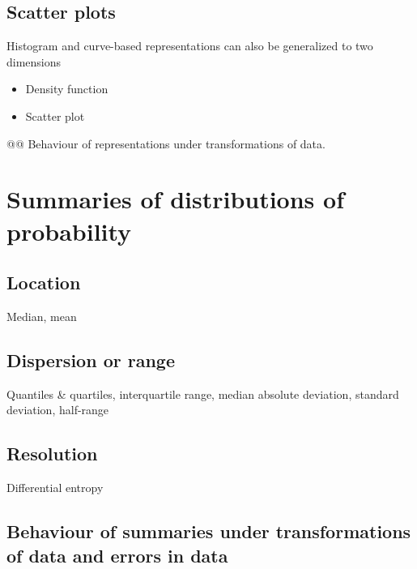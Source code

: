\documentclass[
  a4paper,
  DIV=11,
  numbers=noendperiod,
  oneside]{scrreprt}
\begin{document}
\hypertarget{scatter-plots}{%
\subsection{Scatter plots}\label{scatter-plots}}

Histogram and curve-based representations can also be generalized to two
dimensions

\begin{itemize}
\item
  Density function
\item
  Scatter plot
\end{itemize}

@@ Behaviour of representations under transformations of data.

\hypertarget{summaries-of-distributions-of-probability}{%
\section{Summaries of distributions of
probability}\label{summaries-of-distributions-of-probability}}

\hypertarget{location}{%
\subsection{Location}\label{location}}

Median, mean

\hypertarget{dispersion-or-range}{%
\subsection{Dispersion or range}\label{dispersion-or-range}}

Quantiles \& quartiles, interquartile range, median absolute deviation,
standard deviation, half-range

\hypertarget{resolution}{%
\subsection{Resolution}\label{resolution}}

Differential entropy

\hypertarget{behaviour-of-summaries-under-transformations-of-data-and-errors-in-data}{%
\subsection{Behaviour of summaries under transformations of data and
errors in
data}\label{behaviour-of-summaries-under-transformations-of-data-and-errors-in-data}}
\end{document}
